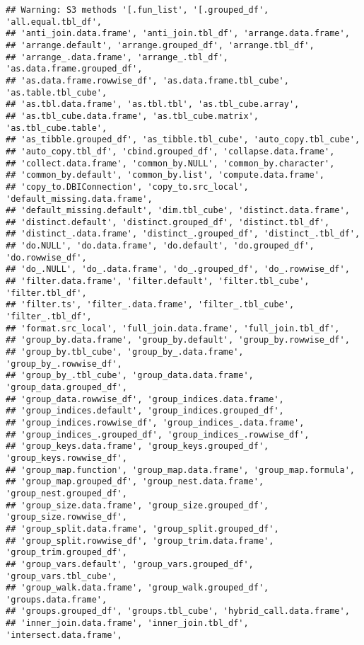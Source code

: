 \documentclass[]{article}
\begin{document}
\begin{verbatim}
## Warning: S3 methods '[.fun_list', '[.grouped_df', 'all.equal.tbl_df',
## 'anti_join.data.frame', 'anti_join.tbl_df', 'arrange.data.frame',
## 'arrange.default', 'arrange.grouped_df', 'arrange.tbl_df',
## 'arrange_.data.frame', 'arrange_.tbl_df', 'as.data.frame.grouped_df',
## 'as.data.frame.rowwise_df', 'as.data.frame.tbl_cube', 'as.table.tbl_cube',
## 'as.tbl.data.frame', 'as.tbl.tbl', 'as.tbl_cube.array',
## 'as.tbl_cube.data.frame', 'as.tbl_cube.matrix', 'as.tbl_cube.table',
## 'as_tibble.grouped_df', 'as_tibble.tbl_cube', 'auto_copy.tbl_cube',
## 'auto_copy.tbl_df', 'cbind.grouped_df', 'collapse.data.frame',
## 'collect.data.frame', 'common_by.NULL', 'common_by.character',
## 'common_by.default', 'common_by.list', 'compute.data.frame',
## 'copy_to.DBIConnection', 'copy_to.src_local', 'default_missing.data.frame',
## 'default_missing.default', 'dim.tbl_cube', 'distinct.data.frame',
## 'distinct.default', 'distinct.grouped_df', 'distinct.tbl_df',
## 'distinct_.data.frame', 'distinct_.grouped_df', 'distinct_.tbl_df',
## 'do.NULL', 'do.data.frame', 'do.default', 'do.grouped_df', 'do.rowwise_df',
## 'do_.NULL', 'do_.data.frame', 'do_.grouped_df', 'do_.rowwise_df',
## 'filter.data.frame', 'filter.default', 'filter.tbl_cube', 'filter.tbl_df',
## 'filter.ts', 'filter_.data.frame', 'filter_.tbl_cube', 'filter_.tbl_df',
## 'format.src_local', 'full_join.data.frame', 'full_join.tbl_df',
## 'group_by.data.frame', 'group_by.default', 'group_by.rowwise_df',
## 'group_by.tbl_cube', 'group_by_.data.frame', 'group_by_.rowwise_df',
## 'group_by_.tbl_cube', 'group_data.data.frame', 'group_data.grouped_df',
## 'group_data.rowwise_df', 'group_indices.data.frame',
## 'group_indices.default', 'group_indices.grouped_df',
## 'group_indices.rowwise_df', 'group_indices_.data.frame',
## 'group_indices_.grouped_df', 'group_indices_.rowwise_df',
## 'group_keys.data.frame', 'group_keys.grouped_df', 'group_keys.rowwise_df',
## 'group_map.function', 'group_map.data.frame', 'group_map.formula',
## 'group_map.grouped_df', 'group_nest.data.frame', 'group_nest.grouped_df',
## 'group_size.data.frame', 'group_size.grouped_df', 'group_size.rowwise_df',
## 'group_split.data.frame', 'group_split.grouped_df',
## 'group_split.rowwise_df', 'group_trim.data.frame', 'group_trim.grouped_df',
## 'group_vars.default', 'group_vars.grouped_df', 'group_vars.tbl_cube',
## 'group_walk.data.frame', 'group_walk.grouped_df', 'groups.data.frame',
## 'groups.grouped_df', 'groups.tbl_cube', 'hybrid_call.data.frame',
## 'inner_join.data.frame', 'inner_join.tbl_df', 'intersect.data.frame',

\end{verbatim}
\end{document}

